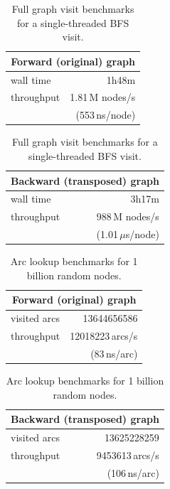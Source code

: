 \begin{table}
  \centering
  \caption{Full graph visit benchmarks for a single-threaded BFS visit.}%
  \label{tab:compression-bfs-benchmark}
  
  \hfill
  \begin{tabular}{lr}
    \multicolumn{2}{c}{\textbf{Forward (original) graph}} \\
    \hline\hline
    wall time      & 1h48m \\
    throughput     & 1.81\,M nodes/s \\
                   & (553\,ns/node) \\
    \hline
  \end{tabular}
  \hfill
  \begin{tabular}{lr}
    \multicolumn{2}{c}{\textbf{Backward (transposed) graph}} \\
    \hline\hline
    wall time      & 3h17m\\
    throughput     & 988\,M nodes/s \\
                   & (1.01\,$\mu$s/node) \\
    \hline
  \end{tabular}
  \hfill
\end{table}

\begin{table}
  \centering
  \caption{Arc lookup benchmarks for 1 billion random nodes.}%
  \label{tab:compression-arc-benchmark}


  \hfill
  \begin{tabular}{lr}
    \multicolumn{2}{c}{\textbf{Forward (original) graph}} \\
    \hline\hline
    visited arcs  & \num{13644656586} \\
    throughput    & \num{12018223}\,arcs/s \\
                  & (83\,ns/arc) \\
    \hline
  \end{tabular}
  \hfill
  \begin{tabular}{lr}
    \multicolumn{2}{c}{\textbf{Backward (transposed) graph}} \\
    \hline\hline
    visited arcs  & \num{13625228259} \\
    throughput    & \num{9453613}\,arcs/s \\
                  & (106\,ns/arc) \\
    \hline
  \end{tabular}
  \hfill
\end{table}



